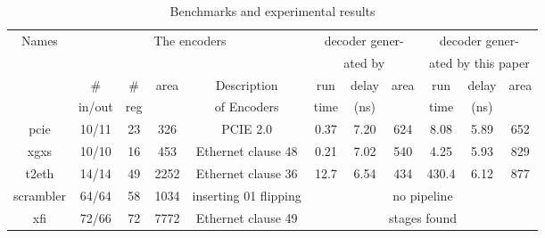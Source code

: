 \documentclass[runningheads,a4paper,orivec]{llncs}
\begin{document}
\begin{table}[t]
\caption{Benchmarks and experimental results}
\begin{tabular}{|c|c|c|c|c|c|c|c|c|c|c|}
\hline
 Names     & \multicolumn{4}{|c|}{The encoders}                                  &   \multicolumn{3}{|c|}{decoder gener-}             &   \multicolumn{3}{|c|}{decoder gener-} \\    
           & \multicolumn{4}{|c|}{}                                              &   \multicolumn{3}{|c|}{ated by \cite{ShenTCAD11}}  &   \multicolumn{3}{|c|}{ated by this paper} \\\cline{2-11}
           &    \#   &   \#    &area  & Description                             &run  &delay&area                                     &run  &delay&area \\
           & in/out  &  reg    &      &   of Encoders                            &time &(ns) &                                        &time &(ns) &    \\\hline\hline
 pcie      & 10/11   & 23      & 326  &PCIE 2.0 \cite{pcie21}                    &0.37 &7.20 &624                                     &8.08 & 5.89&652 \\\hline
 xgxs      & 10/10   & 16      & 453  &     Ethernet clause 48 \cite{IEEE8023_S4}&0.21 &7.02 &540                                     &4.25 & 5.93&829 \\\hline
 t2eth     & 14/14   & 49      & 2252 &    Ethernet clause 36 \cite{IEEE8023_S4} &12.7 &6.54 &434                                     &430.4& 6.12&877 \\\hline
scrambler  &64/64    & 58      & 1034 & inserting 01 flipping                    &     \multicolumn{6}{|c|}{no pipeline }\\\cline{1-5}
 xfi       & 72/66   & 72      & 7772 &     Ethernet clause 49 \cite{IEEE8023_S4}&     \multicolumn{6}{|c|}{stages found}\\\hline
\end{tabular}\label{tab_bench}
\end{table}


%            
%            
\end{document}
